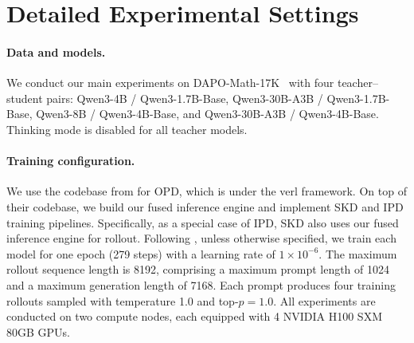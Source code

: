 \documentclass{article} %
\begin{document}








\newpage
\appendix

\section{Detailed Experimental Settings}
\label{sec:full_exp_details}

\paragraph{Data and models.} We conduct our main experiments on DAPO-Math-17K~\citep{yu2025dapo} with four teacher--student pairs: Qwen3-4B / Qwen3-1.7B-Base, Qwen3-30B-A3B / Qwen3-1.7B-Base, Qwen3-8B / Qwen3-4B-Base, and Qwen3-30B-A3B / Qwen3-4B-Base. Thinking mode is disabled for all teacher models.

\paragraph{Training configuration.} We use the codebase from \citet{li2026rethinking} for OPD, which is under the verl \citep{sheng2025hybridflow} framework. On top of their codebase, we build our fused inference engine and implement SKD and IPD training pipelines. Specifically, as a special case of IPD, SKD also uses our fused inference engine for rollout. Following \citet{li2026rethinking}, unless otherwise specified, we train each model for one epoch (279 steps) with a learning rate of $1\times10^{-6}$. The maximum rollout sequence length is 8192, comprising a maximum prompt length of 1024 and a maximum generation length of 7168. Each prompt produces four training rollouts sampled with temperature 1.0 and top-$p=1.0$. All experiments are conducted on two compute nodes, each equipped with 4 NVIDIA H100 SXM 80GB GPUs. 
\end{document}
